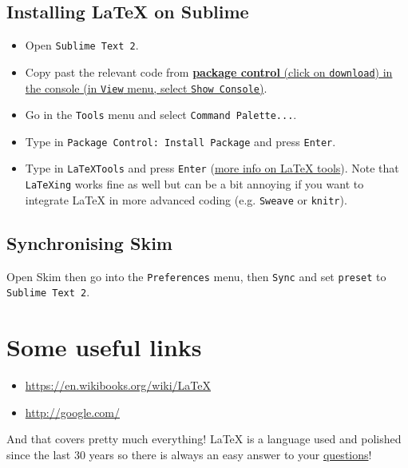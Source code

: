 \documentclass[a4paper,11pt]{article}
\begin{document}
\subsection{Installing LaTeX on Sublime}
\begin{itemize}
\item Open \texttt{Sublime Text 2}.
\item Copy past the relevant code from \href{https://packagecontrol.io/}{\textbf{package control} (click on \texttt{download}) in the console (in \texttt{View} menu, select \texttt{Show Console})}.
\item Go in the \texttt{Tools} menu and select \texttt{Command Palette...}.
\item Type in \texttt{Package Control: Install Package} and press \texttt{Enter}.
\item Type in \texttt{LaTeXTools} and press \texttt{Enter} (\href{https://github.com/SublimeText/LaTeXTools/blob/master/README.markdown}{more info on LaTeX tools}). Note that \texttt{LaTeXing} works fine as well but can be a bit annoying if you want to integrate LaTeX in more advanced coding (e.g. \texttt{Sweave} or \texttt{knitr}).
\end{itemize}

\subsection{Synchronising Skim}
Open Skim then go into the \texttt{Preferences} menu, then \texttt{Sync} and set \texttt{preset} to \texttt{Sublime Text 2}.

\section{Some useful links}
\begin{itemize}
\item \url{https://en.wikibooks.org/wiki/LaTeX}
\item \url{http://google.com/}
\end{itemize}
And that covers pretty much everything!
LaTeX is a language used and polished since the last 30 years so there is always an easy answer to your \href{http://lmgtfy.com/?q=ask+a+question+in+latex}{questions}!
\end{document}
